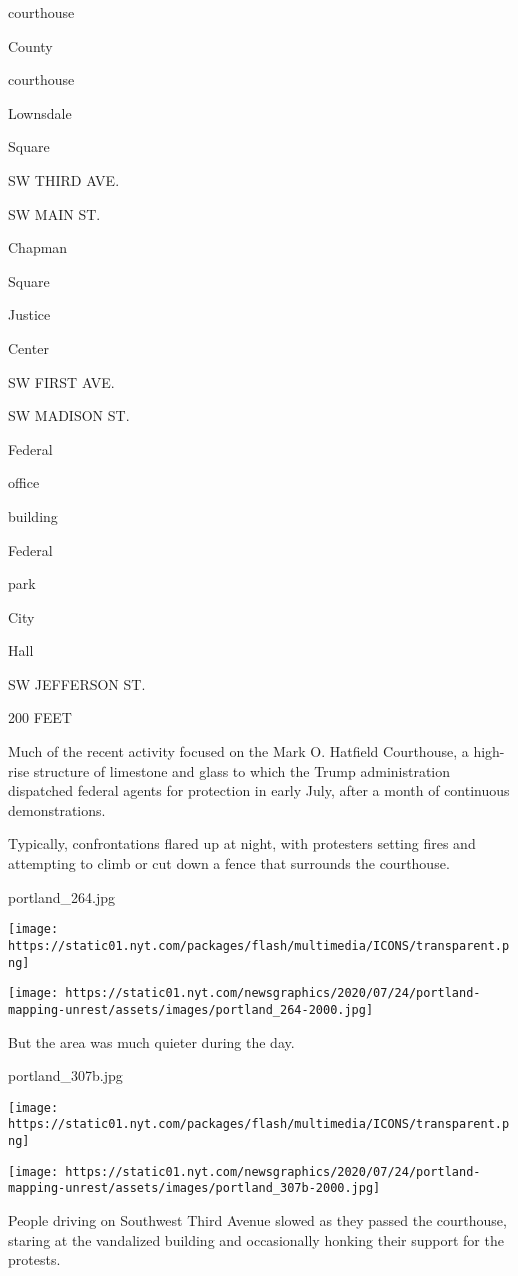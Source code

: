 courthouse

County

courthouse

Lownsdale

Square

SW THIRD AVE.

SW MAIN ST.

Chapman

Square

Justice

Center

SW FIRST AVE.

SW MADISON ST.

Federal

office

building

Federal

park

City

Hall

SW JEFFERSON ST.

200 FEET

Much of the recent activity focused on the Mark O. Hatfield Courthouse,
a high-rise structure of limestone and glass to which the Trump
administration dispatched federal agents for protection in early July,
after a month of continuous demonstrations.

Typically, confrontations flared up at night, with protesters setting
fires and attempting to climb or cut down a fence that surrounds the
courthouse.

portland\_264.jpg

\texttt{[image: https://static01.nyt.com/packages/flash/multimedia/ICONS/transparent.png]}

\texttt{[image: https://static01.nyt.com/newsgraphics/2020/07/24/portland-mapping-unrest/assets/images/portland\_264-2000.jpg]}

But the area was much quieter during the day.

portland\_307b.jpg

\texttt{[image: https://static01.nyt.com/packages/flash/multimedia/ICONS/transparent.png]}

\texttt{[image: https://static01.nyt.com/newsgraphics/2020/07/24/portland-mapping-unrest/assets/images/portland\_307b-2000.jpg]}

People driving on Southwest Third Avenue slowed as they passed the
courthouse, staring at the vandalized building and occasionally honking
their support for the protests.

